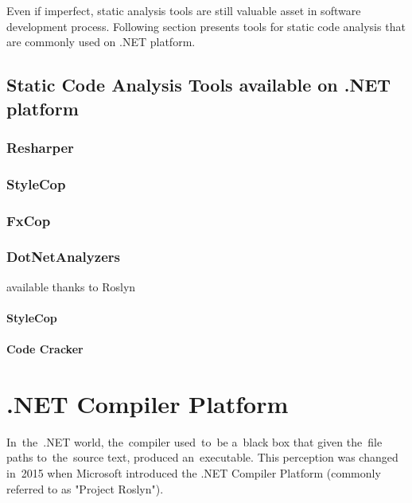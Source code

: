 \documentclass[
  digital, %
  table,   %
  lof,     %
  lot,     %
  oneside,
]{fithesis3}
\begin{document}
\bigskip
Even if imperfect, static analysis tools are still valuable asset in software development process. Following section presents tools for static code analysis that are commonly used on .NET platform.
  
\section{Static Code Analysis Tools available on .NET platform}
\subsection{Resharper}
\subsection{StyleCop}
\subsection{FxCop}
\subsection{DotNetAnalyzers}
  available thanks to Roslyn
\subsubsection{StyleCop}
\subsubsection{Code Cracker}
  
\chapter{.NET Compiler Platform}
In~the~.NET world, the~compiler used~to~be a~black box that given the~file paths to~the~source text, produced an~executable. This perception was changed in~2015 when Microsoft introduced the .NET Compiler Platform (commonly referred to as "Project Roslyn").  

\end{document}
